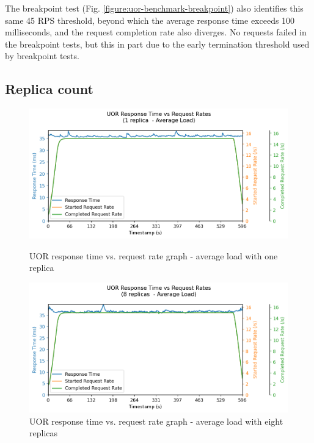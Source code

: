 The breakpoint test (Fig. \ref{figure:uor-benchmark-breakpoint}) also identifies this same 45 RPS threshold, beyond which the average response time exceeds 100 milliseconds, and the request completion rate also diverges. No requests failed in the breakpoint tests, but this in part due to the early termination threshold used by breakpoint tests.

\subsection{Replica count}
\label{subsection:fs-replica-count}

\begin{figure}[h]
    \centering
    \begin{minipage}{.47\textwidth}
        \centering
        \includegraphics[width=\linewidth]{figures/uor-replica-count-i1-average.png}
        \caption{UOR response time vs. request rate graph - average load with one replica}
        \label{figure:uor-replica-count-i1-average}
    \end{minipage}%
    \hspace{0.05\textwidth} %
    \begin{minipage}{.47\textwidth}
        \centering
        \includegraphics[width=\linewidth]{figures/uor-replica-count-i4-average.png}
        \caption{UOR response time vs. request rate graph - average load with eight replicas}
        \label{figure:uor-replica-count-i4-average}
    \end{minipage}
\end{figure}

